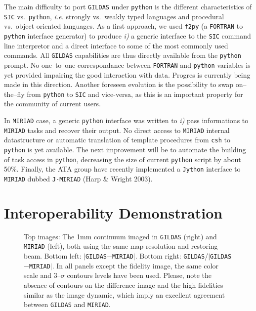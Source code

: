 \documentclass[11pt,twoside]{article}  %
\newcommand{\FORTRAN}{\texttt{FORTRAN}}
\newcommand{\GILDAS}{\texttt{GILDAS}}
\newcommand{\MIRIAD}{\texttt{MIRIAD}}
\newcommand{\python}{\texttt{python}}
\newcommand{\fpig}{\texttt{f2py}}
\newcommand{\SIC}{\texttt{SIC}}
\newcommand{\ie} {{\em i.e.}}
\begin{document}
The main difficulty to port \GILDAS{} under \python{} is the different
characteristics of \SIC{} vs.\ \python{}, \ie{} strongly vs.\ weakly typed
languages and procedural vs.\ object oriented languages. As a first
approach, we used \fpig{} (a \FORTRAN{} to \python{} interface generator)
to produce \emph{i)} a generic interface to the \SIC{} command line
interpretor and a direct interface to some of the most commonly used
commands. All \GILDAS{} capabilities are thus directly available from the
\python{} prompt. No one--to--one correspondance between \FORTRAN{} and
\python{} variables is yet provided impairing the good interaction with
data. Progres is currently being made in this direction. Another foreseen
evolution is the possibility to swap on--the--fly from \python{} to \SIC{}
and vice-versa, as this is an important property for the community of
current users.

In \MIRIAD{} case, a generic \python{} interface was written to \emph{i)}
pass informations to \MIRIAD{} tasks and recover their output.  No direct
access to \MIRIAD{} internal datastructure or automatic translation of
template procedures from \texttt{csh} to \python{} is yet available. The
next improvement will be to automate the building of task access in
\python{}, decreasing the size of current \python{} script by about 50\%.
Finally, the ATA group have recently implemented a \texttt{Jython}
interface to \MIRIAD{} dubbed \texttt{J-MIRIAD} (Harp \& Wright 2003).

\section{Interoperability Demonstration}

\begin{figure}[t]
  \caption{Top images: The 1mm continuum imaged in \GILDAS{} (right) and
    \MIRIAD{} (left), both using the same map resolution and restoring beam.
    Bottom left: $|$\GILDAS{}$-$\MIRIAD{}$|$. Bottom right:
    \GILDAS{}/$|$\GILDAS{}$-$\MIRIAD{}$|$. In all panels except the
    fidelity image, the same color scale and 3--$\sigma$ contours levels
    have been used. Please, note the absence of contours on the difference
    image and the high fidelities similar as the image dynamic, which imply
    an excellent agreement between \GILDAS{} and \MIRIAD{}.}
  \label{fig:P4-14_2}
\end{figure}
\end{document}
